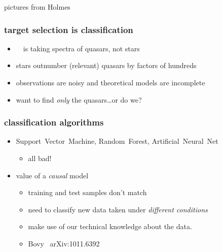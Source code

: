 \documentclass[pdftex]{beamer}
\begin{document}
\begin{frame}
pictures from Holmes
\end{frame}

\begin{frame}
  \frametitle{target selection is classification}
  \begin{itemize}
  \item \sdssiii\ \boss\ is taking spectra of quasars, not stars
  \item stars outnumber (relevant) quasars by factors of hundreds
  \item observations are noisy and theoretical models are incomplete
  \item want to find \emph{only} the quasars\ldots or do we?
  \end{itemize}
\end{frame}

\begin{frame}
  \frametitle{classification algorithms}
  \begin{itemize}
  \item Support~Vector~Machine, Random~Forest, Artificial~Neural~Net
    \begin{itemize}
    \item all bad!
    \end{itemize}
  \item value of a \emph{causal} model
    \begin{itemize}
    \item training and test samples don't match
    \item need to classify new data taken under \emph{different conditions}
    \item make use of our technical knowledge about the data.
    \item Bovy \etal\ arXiv:1011.6392
    \end{itemize}
  \end{itemize}
\end{frame}
\end{document}
